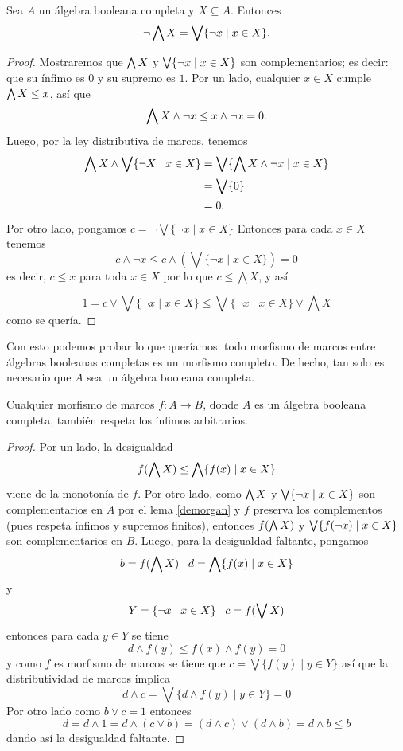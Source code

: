 \begin{lemma}\label{demorgan}
  Sea $A$ un álgebra booleana completa y $X\subseteq A$.
  Entonces
  \[
    \neg \bigwedge X = \bigvee \{\neg x \mid x\in X\}
  .\]
\end{lemma}
\begin{proof}
  Mostraremos que
  $\bigwedge X$ y $\bigvee \{\neg x \mid x\in X\}$ son complementarios;
  es decir: que su ínfimo es $0$ y su supremo es $1$.
  Por un lado, cualquier $x\in X$ cumple $\bigwedge X\leq x$, así que
  \[
      \bigwedge X\wedge\neg x \leq x\wedge \neg x = 0.
  \]
  Luego, por la ley distributiva de marcos, tenemos
  \begin{align*}
      \bigwedge X \wedge \bigvee\{\neg X\mid x\in X\}
      &= \bigvee\{\bigwedge X \wedge \neg x\mid x\in X\} \\
      &= \bigvee\{0\} \\
      &= 0.
  \end{align*}
  Por otro lado, pongamos $c=\neg\bigvee\{\neg x\mid x\in X\}$
  Entonces para cada $x\in X$ tenemos \[c\wedge\neg x\leq c\wedge(\bigvee\{\neg x\mid x\in X\})=0 \]
  es decir, $c\leq x$ para toda $x\in X$ por lo que $c\leq\bigwedge X$,
  y así  
  
  \[1=c\vee \bigvee\{\neg x\mid x\in X\}\leq \bigvee\{\neg x\mid x\in X\}\vee\bigwedge X\]
  como se quería.
\end{proof}

Con esto podemos probar lo que queríamos: todo morfismo de marcos
entre álgebras booleanas completas es un morfismo completo.
De hecho, tan solo es necesario que $A$ sea un álgebra booleana
completa.
\begin{lemma}
    Cualquier morfismo de marcos $f:A\to B$,
    donde $A$ es un álgebra booleana completa,
    también respeta los ínfimos arbitrarios.
\end{lemma}
\begin{proof}
    Por un lado, la desigualdad
    \[
        f(\bigwedge X)\leq\bigwedge\{f(x)\mid x\in X\}
    \]
    viene de la monotonía de $f$.
    Por otro lado, como $\bigwedge X$ y $\bigvee\{\neg x\mid x\in X\}$
    son complementarios en $A$ por el lema \ref{demorgan}
    y $f$ preserva los complementos
    (pues respeta ínfimos y supremos finitos), entonces $f(\bigwedge X)$
    y $\bigvee\{f(\neg x)\mid x\in X\}$ son complementarios en $B$.
    Luego, para la desigualdad faltante, pongamos \[b=f(\bigwedge X)\;\;\; d=\bigwedge\{f(x)\mid x\in X\}\]
    y \[Y=\{\neg x\mid x\in X\}\;\;\; c=f(\bigvee X)\]
    entonces para cada $y\in Y$ se tiene \[d\wedge f(y)\leq f(x)\wedge f(y)=0\]
    y como $f$ es morfismo de marcos se tiene que $c=\bigvee\{f(y)\mid y\in Y\}$
    así que la distributividad de marcos implica 
    \[d\wedge c=\bigvee\{d\wedge f(y)\mid y\in Y\}=0\]
  Por otro lado como $b\vee c=1$ entonces
  \[d=d\wedge 1=d\wedge (c\vee b)=(d\wedge c)\vee(d\wedge b)=d\wedge b\leq b\]
  dando así la desigualdad faltante.
\end{proof}

